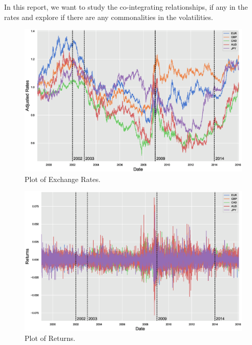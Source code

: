 In this report, we want to study the co-integrating relationships, if any in the rates and explore if there are any commonalities in the volatilities.

	\begin{figure}[!ht]
	\centering
	\includegraphics[width=\textwidth]{chapters/chapter_mvts/figures/pexchrate.eps}
	\caption{Plot of Exchange Rates. \label{fig:pexchrate}}
	\end{figure}
	
	\begin{figure}[!ht]
	\centering
	\includegraphics[width=\textwidth]{chapters/chapter_mvts/figures/preturns.eps}
	\caption{Plot of Returns. \label{fig:preturns}}
	\end{figure}
	
